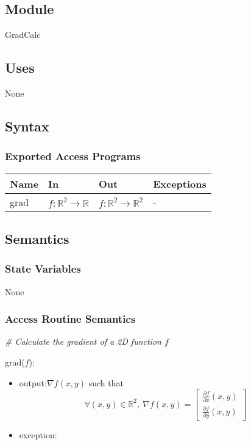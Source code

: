 \documentclass[12pt, titlepage]{article}
\begin{document}
\subsection{Module}
GradCalc
\subsection{Uses}
None
\subsection{Syntax}

\subsubsection{Exported Access Programs}
\begin{center}
\begin{tabular}{p{2cm} p{4cm} p{4cm} p{2cm}}
\hline
\textbf{Name} & \textbf{In} & \textbf{Out} & \textbf{Exceptions} \\
\hline
grad & $f:\mathbb{R}^2\rightarrow\mathbb{R}$  & 
$f:\mathbb{R}^2\rightarrow\mathbb{R}^2$ & -\\
\hline
\end{tabular}
\end{center}

\subsection{Semantics}

\subsubsection{State Variables}
None

\subsubsection{Access Routine Semantics}

\noindent\textit{{\#} Calculate the gradient of a 2D function $f$} \medskip

\noindent grad($f$):
\begin{itemize} 
\item output:$ \nabla f(x,y)$ such that
\begin{equation*}
\forall (x,y) \in \mathbb{R}^2, \ \nabla f(x,y) = \begin{bmatrix}
\frac{\partial f}{\partial x}(x,y) \\
\frac{\partial f}{\partial y}(x,y)
\end{bmatrix}
\end{equation*}
\item exception: 
\end{itemize}
\end{document}
